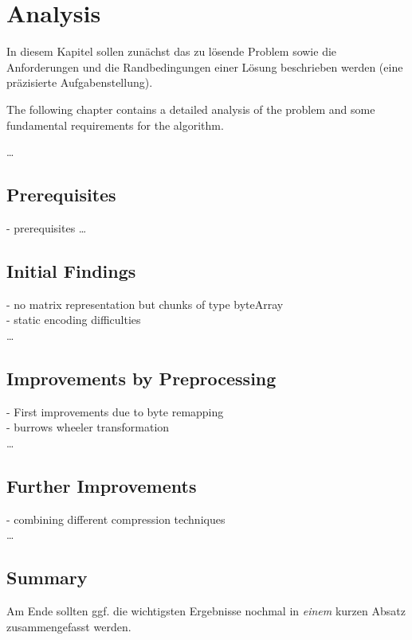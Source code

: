 
\chapter{Analysis}
\label{ch:Analysis}
In diesem Kapitel sollen zunächst das zu lösende Problem
sowie die Anforderungen und die Randbedingungen 
einer Lösung beschrieben werden (eine präzisierte Aufgabenstellung).

\par{
The following chapter contains a detailed analysis of the problem and some fundamental requirements for the algorithm. 
}

\ldots

\section{Prerequisites}
\label{ch:Analysis:sec:Prerequisites}
- prerequisites
\ldots

\section{Initial Findings}
\label{ch:Analysis:sec:Initial Findings}
- no matrix representation but chunks of type byteArray\\
- static encoding difficulties\\
\ldots

\section{Improvements by Preprocessing}
\label{ch:Analysis:sec:Improvements by Preprocessing}
- First improvements due to byte remapping\\
- burrows wheeler transformation\\
\ldots

\section{Further Improvements}
\label{ch:Analysis:sec:Further Improvements}
- combining different compression techniques\\
\ldots


\section{Summary}
\label{ch:Analyse:sec:Summary}

Am Ende sollten ggf. die wichtigsten Ergebnisse nochmal in \emph{einem}
kurzen Absatz zusammengefasst werden.

